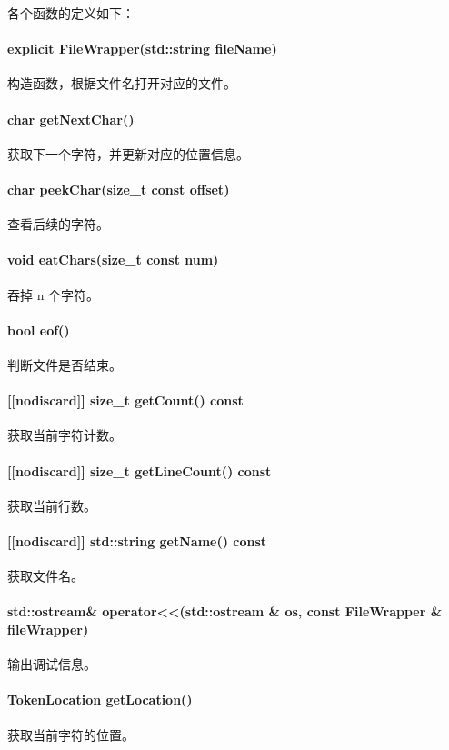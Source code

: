 \documentclass[blue,normal,cn]{elegantnote}
\begin{document}
各个函数的定义如下：

\paragraph{explicit FileWrapper(std::string fileName)}
构造函数，根据文件名打开对应的文件。

\paragraph{char getNextChar()}
获取下一个字符，并更新对应的位置信息。

\paragraph{char peekChar(size\_t const offset)}
查看后续的字符。

\paragraph{void eatChars(size\_t const num)}
吞掉 n 个字符。

\paragraph{bool eof()}
判断文件是否结束。

\paragraph{[[nodiscard]] size\_t getCount() const}
获取当前字符计数。

\paragraph{[[nodiscard]] size\_t getLineCount() const}
获取当前行数。

\paragraph{[[nodiscard]] std::string getName() const}
获取文件名。

\paragraph{std::ostream\& operator<<(std::ostream \& os, const FileWrapper \& fileWrapper)}
输出调试信息。

\paragraph{TokenLocation getLocation()}
获取当前字符的位置。
\end{document}

